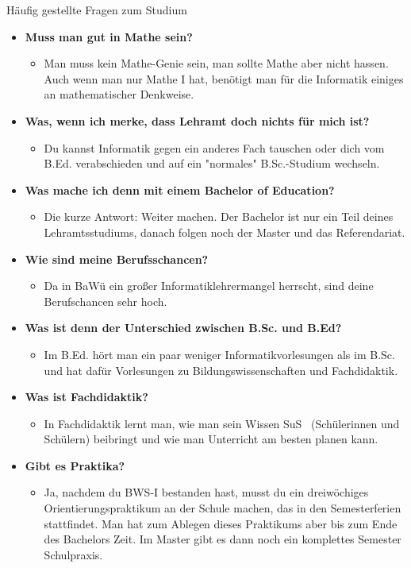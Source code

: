 \begin{block}{Häufig gestellte Fragen zum Studium}
\begin{large}
\begin{itemize}
\item \textbf{Muss man gut in Mathe sein?}
\begin{itemize}
	\item Man muss kein Mathe-Genie sein, man sollte Mathe aber nicht hassen. Auch wenn man nur Mathe I hat, benötigt man für die Informatik einiges an mathematischer Denkweise.
\end{itemize}
\item \textbf{Was, wenn ich merke, dass Lehramt doch nichts für mich ist?} 
\begin{itemize}
	\item Du kannst Informatik gegen ein anderes Fach tauschen oder dich vom B.Ed. verabschieden und auf ein "normales" B.Sc.-Studium wechseln.
\end{itemize}
\item \textbf{Was mache ich denn mit einem Bachelor of Education?} 
\begin{itemize}
	\item Die kurze Antwort: Weiter machen. Der Bachelor ist nur ein Teil deines Lehramtsstudiums, danach folgen noch der Master und das Referendariat.
\end{itemize}
\item \textbf{Wie sind meine Berufsschancen?} 
\begin{itemize}
	\item Da in BaWü ein großer Informatiklehrermangel herrscht, sind deine Berufschancen sehr hoch.
\end{itemize}
\item \textbf{Was ist denn der Unterschied zwischen B.Sc. und B.Ed?} 
\begin{itemize}
	\item Im B.Ed. hört man ein paar weniger Informatikvorlesungen als im B.Sc. und hat dafür Vorlesungen zu Bildungswissenschaften und Fachdidaktik.
\end{itemize}
\item \textbf{Was ist Fachdidaktik?} 
\begin{itemize}
	\item In Fachdidaktik lernt man, wie man sein Wissen SuS~ (Schülerinnen und Schülern) beibringt und wie man Unterricht am besten planen kann.
\end{itemize}

\item \textbf{Gibt es Praktika?}
\begin{itemize}
	\item Ja, nachdem du BWS-I bestanden hast, musst du ein dreiwöchiges Orientierungspraktikum an der Schule machen, das in den Semesterferien stattfindet. Man hat zum Ablegen dieses Praktikums aber bis zum Ende des Bachelors Zeit. Im Master gibt es dann noch ein komplettes Semester Schulpraxis.
\end{itemize}


\end{itemize}
\end{large}
\end{block}
